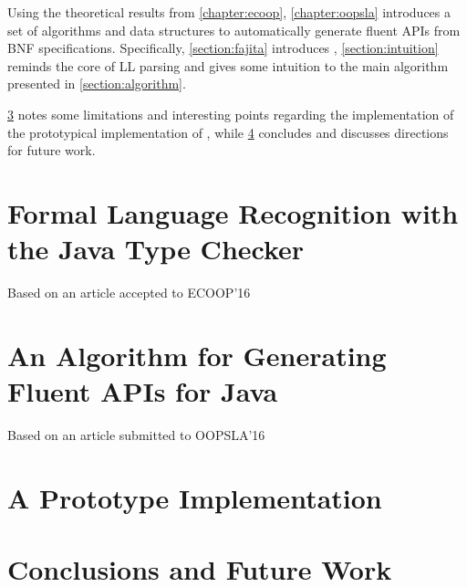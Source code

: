 \documentclass[12pt]{book}
\begin{document}
Using the theoretical results from \cref{chapter:ecoop}, \cref{chapter:oopsla}
introduces a set of algorithms and data structures to automatically generate
fluent APIs from BNF specifications. Specifically,
\cref{section:fajita} introduces \Fajita, \cref{section:intuition}
reminds the core of LL parsing and gives some intuition to the main algorithm
presented in \cref{section:algorithm}.

\cref{chapter:prototype} notes some limitations and interesting points
regarding the implementation of the prototypical implementation of \Fajita,
while \cref{chapter:conclusions} concludes and discusses directions for future
work.

\chapter{Formal Language Recognition with the Java Type Checker}
\Large Based on an article accepted to ECOOP'16~\cite{Gil:Levy:2016}
\label{chapter:ecoop}
\normalsize


\chapter{An Algorithm for Generating Fluent APIs for Java}
\Large Based on an article submitted to OOPSLA'16~\cite{Gil:Levy:2016a}
\label{chapter:oopsla}
\normalsize


\chapter{A Prototype Implementation}
\label{chapter:prototype}


\chapter{Conclusions and Future Work}
\label{chapter:conclusions}





\end{document}
